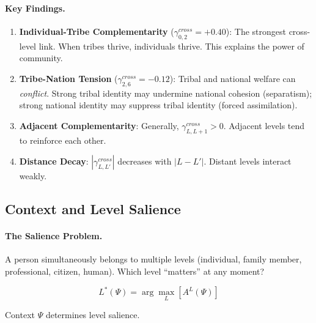\paragraph{Key Findings.}
\begin{enumerate}
\item \textbf{Individual-Tribe Complementarity} ($\gamma^{cross}_{0,2} = +0.40$): 
The strongest cross-level link. When tribes thrive, individuals thrive. 
This explains the power of community.

\item \textbf{Tribe-Nation Tension} ($\gamma^{cross}_{2,6} = -0.12$): 
Tribal and national welfare can \textit{conflict}. Strong tribal identity 
may undermine national cohesion (separatism); strong national identity 
may suppress tribal identity (forced assimilation).

\item \textbf{Adjacent Complementarity}: Generally, $\gamma^{cross}_{L,L+1} > 0$. 
Adjacent levels tend to reinforce each other.

\item \textbf{Distance Decay}: $|\gamma^{cross}_{L,L'}|$ decreases with $|L - L'|$. 
Distant levels interact weakly.
\end{enumerate}

\subsection{Context and Level Salience}

\paragraph{The Salience Problem.}
A person simultaneously belongs to multiple levels (individual, family member, 
professional, citizen, human). Which level ``matters'' at any moment?

\begin{equation}
L^*(\Psi) = \arg\max_L \left[ A^L(\Psi) \right]
\end{equation}

Context $\Psi$ determines level salience.

